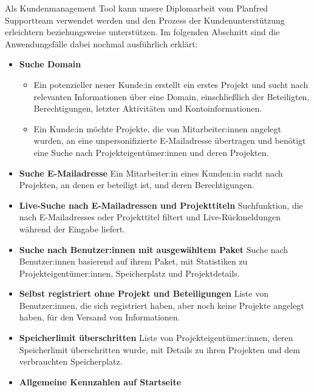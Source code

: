 Als Kundenmanagement Tool kann unsere Diplomarbeit vom Planfred Supportteam verwendet werden und den Prozess der Kundenunterstützung erleichtern beziehungsweise unterstützen.
Im folgenden Abschnitt sind die Anwendungsfälle dabei nochmal ausführlich erklärt:

\begin{itemize}
    \item \textbf{Suche Domain}
        \begin{itemize}
            \item Ein potenzieller neuer Kunde:in erstellt ein erstes Projekt und sucht nach relevanten Informationen über eine Domain, einschließlich der Beteiligten, Berechtigungen, letzter Aktivitäten und Kontoinformationen.
            \item  Ein Kunde:in möchte Projekte, die von Mitarbeiter:innen angelegt wurden, an eine unpersonifizierte E-Mailadresse übertragen und benötigt eine Suche nach Projekteigentümer:innen und deren Projekten.
        \end{itemize}
    \item \textbf{Suche E-Mailadresse}
        \newline
        Ein Mitarbeiter:in eines Kunden:in sucht nach Projekten, an denen er beteiligt ist, und deren Berechtigungen.
    \item \textbf{Live-Suche nach E-Mailadressen und Projekttiteln}
        \newline
        Suchfunktion, die nach E-Mailadresses oder Projekttitel filtert und Live-Rückmeldungen während der Eingabe liefert.
    \item \textbf{Suche nach Benutzer:innen mit ausgewähltem Paket}
        \newline
        Suche nach Benutzer:innen basierend auf ihrem Paket, mit Statistiken zu Projekteigentümer:innen, Speicherplatz und Projektdetails.
    \item \textbf{Selbst registriert ohne Projekt und Beteiligungen}
        \newline
        Liste von Benutzer:innen, die sich registriert haben, aber noch keine Projekte angelegt haben, für den Versand von Informationen.
    \item \textbf{Speicherlimit überschritten}
        \newline
        Liste von Projekteigentümer:innen, deren Speicherlimit überschritten wurde, mit Details zu ihren Projekten und dem verbrauchten Speicherplatz.
    \item \textbf{Allgemeine Kennzahlen auf Startseite}

\end{itemize}
